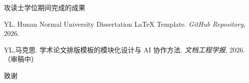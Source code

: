 \documentclass[../main-manual.tex]{subfiles}
\begin{document}
\cleardoublepage
\begin{center}
	{\heiti {} 攻读\youreduction 士学位期间完成的成果}
\end{center}
\vspace{0.1cm}
\songti {}

{
	\begin{enumerate}[label=\textbf{[\arabic*]}]
		\item YL. Hunan Normal University Dissertation \LaTeX{} Template.
			\textit{GitHub Repository}, 2026.
		\item YL,马克思. 学术论文排版模板的模块化设计与 AI 协作方法.
			\textit{文档工程学报}, 2026.（审稿中）
	\end{enumerate}
}

\cleardoublepage
\begin{center}
	{\heiti {} 致\hspace{2em}谢}
\end{center}
\vspace{0.5cm}
\end{document}
